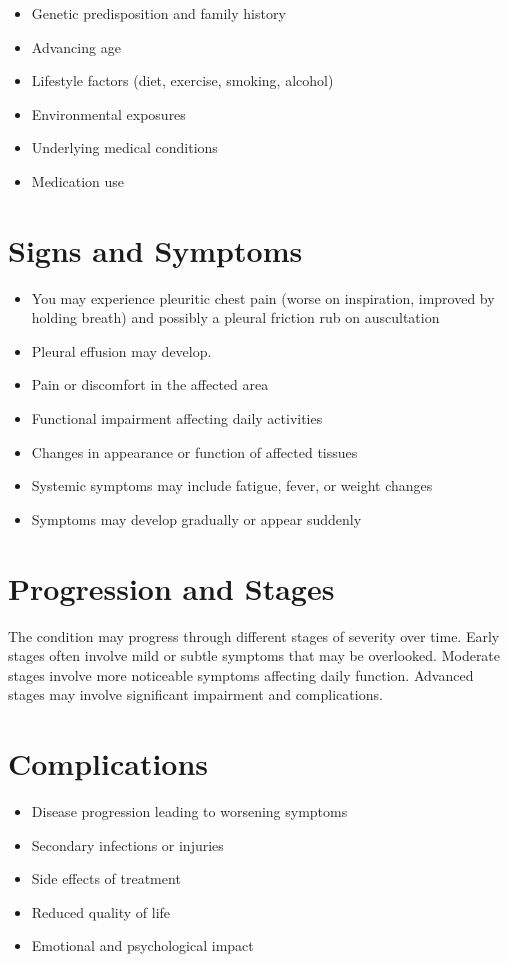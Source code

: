 \begin{itemize}[noitemsep]
  \item Genetic predisposition and family history
  \item Advancing age
  \item Lifestyle factors (diet, exercise, smoking, alcohol)
  \item Environmental exposures
  \item Underlying medical conditions
  \item Medication use
\end{itemize}
\section{Signs and Symptoms}
\begin{itemize}[noitemsep]
  \item You may experience pleuritic chest pain (worse on inspiration, improved by holding breath) and possibly a pleural friction rub on auscultation
  \item Pleural effusion may develop.
  \item Pain or discomfort in the affected area
  \item Functional impairment affecting daily activities
  \item Changes in appearance or function of affected tissues
  \item Systemic symptoms may include fatigue, fever, or weight changes
  \item Symptoms may develop gradually or appear suddenly
\end{itemize}
\section{Progression and Stages}
The condition may progress through different stages of severity over time. Early stages often involve mild or subtle symptoms that may be overlooked. Moderate stages involve more noticeable symptoms affecting daily function. Advanced stages may involve significant impairment and complications.
\section{Complications}
\begin{itemize}[noitemsep]
  \item Disease progression leading to worsening symptoms
  \item Secondary infections or injuries
  \item Side effects of treatment
  \item Reduced quality of life
  \item Emotional and psychological impact
\end{itemize}
